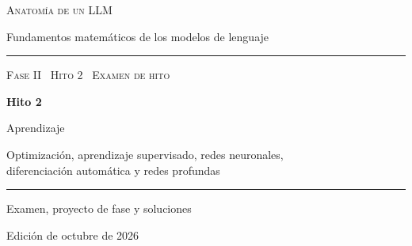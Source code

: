 \documentclass[11pt,a4paper,twoside,openany]{book}
\begin{document}
\frontmatter
\begin{titlepage}
\centering
\vspace*{2.5cm}
{\large\scshape Anatomía de un LLM}\par
\vspace{0.4cm}
{\normalsize Fundamentos matemáticos de los modelos de lenguaje}\par
\vspace{2.2cm}
\rule{\textwidth}{0.8pt}\par\vspace{0.5cm}
{\small\scshape Fase II \textperiodcentered\ Hito 2 \textperiodcentered\ Examen de hito}\par\vspace{0.3cm}
{\Huge\bfseries Hito 2\par}\vspace{0.3cm}
{\LARGE Aprendizaje\par}
\vspace{0.3cm}
{\large Optimización, aprendizaje supervisado, redes neuronales,\\ diferenciación automática y redes profundas\par}
\vspace{0.5cm}\rule{\textwidth}{0.4pt}\par
\vspace{1.6cm}
{\large Examen, proyecto de fase y soluciones}\par
\vfill
{\small Edición de octubre de 2026}\par
\end{titlepage}



\tableofcontents

\mainmatter




\appendix



\backmatter

\end{document}
